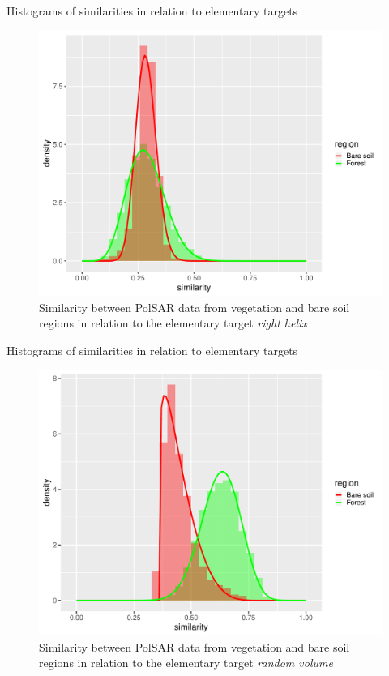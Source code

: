 \documentclass[10pt]{beamer}
\begin{document}
\begin{frame}[fragile]{Histograms of similarities in relation to elementary targets}

\begin{figure}
    \centering
    \includegraphics[width = .6\linewidth]{rh.pdf}
    \caption{Similarity between PolSAR data from vegetation and bare soil regions in relation to the elementary target \textit{right helix}}
    \label{fig:rh}
\end{figure}
    
\end{frame}

\begin{frame}[fragile]{Histograms of similarities in relation to elementary targets}

\begin{figure}
    \centering
    \includegraphics[width = .6\linewidth]{rv.pdf}
    \caption{Similarity between PolSAR data from vegetation and bare soil regions in relation to the elementary target \textit{random volume}}
    \label{fig:rv}
\end{figure}
    
\end{frame}
\end{document}
